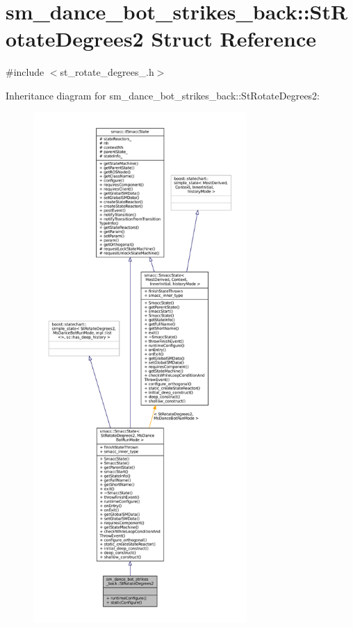 \hypertarget{structsm__dance__bot__strikes__back_1_1StRotateDegrees2}{}\section{sm\+\_\+dance\+\_\+bot\+\_\+strikes\+\_\+back\+:\+:St\+Rotate\+Degrees2 Struct Reference}
\label{structsm__dance__bot__strikes__back_1_1StRotateDegrees2}


{\ttfamily \#include $<$st\+\_\+rotate\+\_\+degrees\+\_.\+h$>$}



Inheritance diagram for sm\+\_\+dance\+\_\+bot\+\_\+strikes\+\_\+back\+:\+:St\+Rotate\+Degrees2\+:
\nopagebreak
\begin{figure}[H]
\begin{center}
\leavevmode
\includegraphics[height=550pt]{structsm__dance__bot__strikes__back_1_1StRotateDegrees2__inherit__graph}
\end{center}
\end{figure}


